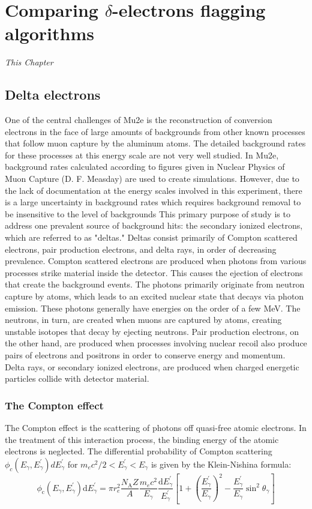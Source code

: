 \chapter{Comparing $\delta$-electrons flagging algorithms}
\textit{This Chapter}
\section{Delta electrons}
One of the central challenges of Mu2e is the reconstruction of conversion electrons in the face of
large amounts of backgrounds from other known processes that follow muon capture by the
aluminum atoms. The detailed background rates for these processes at this energy scale are not very
well studied. In Mu2e, background rates calculated according to figures given in Nuclear Physics of
Muon Capture (D. F. Measday) are used to create simulations. However, due to the lack of
documentation at the energy scales involved in this experiment, there is a large uncertainty in
background rates which requires background removal to be insensitive to the level of backgrounds
This primary purpose of study is to address one prevalent source of background hits: the
secondary ionized electrons, which are referred to as "deltas." Deltas consist primarily of Compton
scattered electrons, pair production electrons, and delta rays, in order of decreasing prevalence.
Compton scattered electrons are produced when photons from various processes strike material
inside the detector. This causes the ejection of electrons that create the background events. The
photons primarily originate from neutron capture by atoms, which leads to an excited nuclear state
that decays via photon emission. These photons generally have energies on the order of a few MeV.
The neutrons, in turn, are created when muons are captured by atoms, creating unstable isotopes that
decay by ejecting neutrons. Pair production electrons, on the other hand, are produced when
processes involving nuclear recoil also produce pairs of electrons and positrons in order to conserve
energy and momentum. Delta rays, or secondary ionized electrons, are produced when charged
energetic particles collide with detector material.

\subsection{The Compton effect}
The Compton effect is the scattering of photons off quasi-free atomic electrons. 
In the treatment of this interaction process, the binding energy of
the atomic electrons is neglected. The differential probability of 
Compton scattering $\phi_c(E_\gamma, E^'_\gamma) dE^'_\gamma$ for $m_e c^2/2 < E^'_\gamma < E_\gamma$ 
is given by the Klein-Nishina formula:
\begin{equation}
    \phi_{\mathrm{c}}\left(E_\gamma, E_\gamma^{\prime}\right) \mathrm{d} E_\gamma^{\prime}=\pi r_e^2 \frac{N_{\mathrm{A}} Z}{A} \frac{m_e c^2}{E_\gamma} \frac{\mathrm{d} E_\gamma^{\prime}}{E_\gamma^{\prime}}\left[1+\left(\frac{E_\gamma^{\prime}}{E_\gamma}\right)^2-\frac{E_\gamma^{\prime}}{E_\gamma} \sin ^2 \theta_\gamma\right]
\end{equation}

